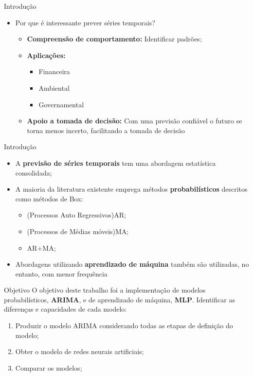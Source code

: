 \documentclass[compress,aspectratio=149,brazil]{beamer}
\begin{document}
\begin{frame}{Introdução}
    \begin{itemize}
        \item Por que é interessante prever séries temporais?
        \begin{itemize}
            \item \textbf{Compreensão de comportamento:} Identificar padrões;
            \item \textbf{Aplicações:}
                \begin{itemize}
                    \item Financeira
                    \item Ambiental
                    \item Governamental
                \end{itemize}
            \item \textbf{Apoio a tomada de decisão:} Com uma previsão
                confiável o futuro se torna menos incerto, facilitando a tomada
                de decisão
        \end{itemize}
    \end{itemize}
\end{frame}

\begin{frame}{Introdução}
    \begin{itemize}
        \item<1-> A \textbf{previsão de séries temporais} tem uma abordagem
            estatística consolidada;
        \item<1-> A maioria da literatura existente emprega métodos
            \textbf{probabilísticos} descritos como métodos de Box:
        \begin{itemize}
            \item<2-> (Processos Auto Regressivos)AR;
            \item<3-> (Processos de Médias móveis)MA;
            \item<3-> AR+MA;
        \end{itemize}
    \item<4-> Abordagens utilizando \textbf{aprendizado de máquina} também são
            utilizadas, no entanto, com menor frequência
    \end{itemize}
\end{frame}

\begin{frame}{Objetivo}
    O objetivo deste  trabalho foi a implementação  de modelos probabilísticos,
    \textbf{ARIMA}, e de aprendizado de máquina, \textbf{MLP}. Identificar as
    diferenças e capacidades de cada modelo:

    \begin{enumerate}
        \item<2-> Produzir o modelo ARIMA considerando todas as etapas de definição
            do modelo;
        \item<3-> Obter o modelo de redes neurais artificiais;
        \item<4-> Comparar os modelos;
    \end{enumerate}
\end{frame}
\end{document}
